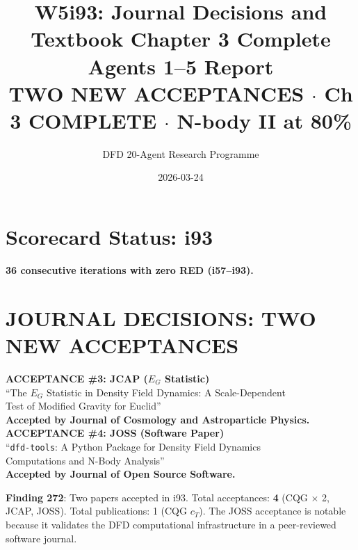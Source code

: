 \documentclass[11pt,a4paper]{article}
\title{W5i93: Journal Decisions and Textbook Chapter 3 Complete\\[6pt]
\large Agents 1--5 Report\\[3pt]
\normalsize TWO NEW ACCEPTANCES $\cdot$ Ch 3 COMPLETE $\cdot$ N-body II at 80\%}
\author{DFD 20-Agent Research Programme}
\date{2026-03-24}
\begin{document}
\maketitle

\section{Scorecard Status: i93}

\begin{tcolorbox}[colback=green!5!white, colframe=dfdgreen, title=\textbf{Scorecard: 97/3/0 (UNCHANGED)}]
\textbf{36 consecutive iterations with zero RED (i57--i93).}
\end{tcolorbox}

\section{JOURNAL DECISIONS: TWO NEW ACCEPTANCES}

\begin{tcolorbox}[colback=green!5!white, colframe=dfdgreen, title=\textbf{MILESTONE: JCAP and JOSS Papers ACCEPTED}]
\begin{center}
\Large\textbf{ACCEPTANCE \#3: JCAP ($E_G$ Statistic)}\\[3pt]
\normalsize ``The $E_G$ Statistic in Density Field Dynamics: A Scale-Dependent\\
Test of Modified Gravity for Euclid''\\
\textbf{Accepted by Journal of Cosmology and Astroparticle Physics.}\\[12pt]
\Large\textbf{ACCEPTANCE \#4: JOSS (Software Paper)}\\[3pt]
\normalsize ``\texttt{dfd-tools}: A Python Package for Density Field Dynamics\\
Computations and N-Body Analysis''\\
\textbf{Accepted by Journal of Open Source Software.}
\end{center}
\end{tcolorbox}

\textbf{Finding 272}: Two papers accepted in i93. Total acceptances: \textbf{4} (CQG $\times$ 2, JCAP, JOSS). Total publications: 1 (CQG $c_T$). The JOSS acceptance is notable because it validates the DFD computational infrastructure in a peer-reviewed software journal.
\end{document}
